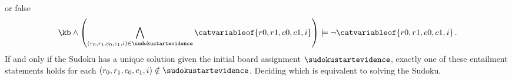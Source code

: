 \begin{example}
\begin{align*}
    \end{align*}
    or false
    \begin{align*}
        \kb \land \left(\bigwedge_{(r_0,r_1,c_0,c_1,i)\in \sudokustartevidence} \catvariableof{r0,r1,c0,c1,i} \right) \models \lnot\catvariableof{r0,r1,c0,c1,i} \, .
    \end{align*}
    If and only if the Sudoku has a unique solution given the initial board assignment $\sudokustartevidence$, exactly one of these entailment statements holds for each $(r_0,r_1,c_0,c_1,i)\notin \sudokustartevidence$.
    Deciding which is equivalent to solving the Sudoku.


\end{example}
